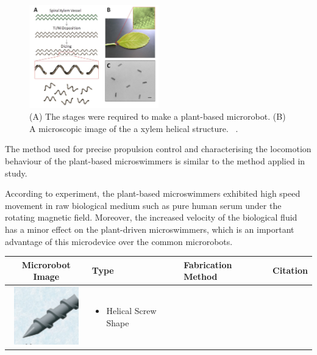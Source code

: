 \documentclass[a4paper,11pt]{article}
\begin{document}
\begin{sloppypar}
\begin{figure}
  \begin{center}
    \includegraphics[width=0.5\textwidth]{plants2}
  \caption{(A) The stages were required to make a plant-based microrobot. (B) A microscopic image of the 
a xylem helical structure. ~\citep{gao2013bioinspired}.}
  \label{plants2}
\end{center}
\end{figure}


The method used for precise propulsion control and characterising the locomotion behaviour of the 
plant-based microswimmers is similar to the method applied in \citeauthor{gao2013bioinspired} study.

According to \citeauthor{gao2013bioinspired} experiment, the plant-based 
microswimmers exhibited high speed movement in raw biological medium such as 
pure human serum under the rotating magnetic field. Moreover, the increased velocity of the 
biological fluid has a minor effect on the plant-driven microswimmers, which is an important 
advantage of this microdevice over the common microrobots.

\begin{table}[h!]
  \centering

\setlength{\arrayrulewidth}{.6mm}
\setlength{\tabcolsep}{5pt}
\renewcommand{\arraystretch}{.8}


  \begin{tabular}{ c  m{3cm}  m{4.3cm} m{3cm} }
    \hline
\rowcolor{lightgray}
    Microrobot Image & Type  & Fabrication Method & Citation \\ \hline\hline
    \begin{minipage}{.3\textwidth}
      \includegraphics[width=\linewidth, height=25mm]{screw_ta}
    \end{minipage}
    &
      \begin{itemize}
        \item Helical Screw Shape
    

\end{itemize}
\end{tabular}
\end{table}
\end{sloppypar}
\end{document}

